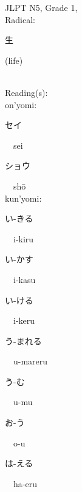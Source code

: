 \begin{multicols}{2}
{JLPT N5, Grade 1, \\Radical:\ \ {\begin{CJK}{UTF8}{min} 生 \end{CJK}} (life) } \\
Reading(s):\ \ \\
{\hspace*{1em}}on'yomi:\ \ \\
{\hspace*{2em}}{\begin{CJK}{UTF8}{min} セイ \end{CJK}}\ \ sei\ \ \\
{\hspace*{2em}}{\begin{CJK}{UTF8}{min} ショウ \end{CJK}}\ \ sh\=o\ \ \\
{\hspace*{1em}}kun'yomi:\ \ \\
{\hspace*{2em}}{\begin{CJK}{UTF8}{min} い-きる \end{CJK}}\ \ i-kiru\ \ \\
{\hspace*{2em}}{\begin{CJK}{UTF8}{min} い-かす \end{CJK}}\ \ i-kasu\ \ \\
{\hspace*{2em}}{\begin{CJK}{UTF8}{min} い-ける \end{CJK}}\ \ i-keru\ \ \\
{\hspace*{2em}}{\begin{CJK}{UTF8}{min} う-まれる \end{CJK}}\ \ u-mareru\ \ \\
{\hspace*{2em}}{\begin{CJK}{UTF8}{min} う-む \end{CJK}}\ \ u-mu\ \ \\
{\hspace*{2em}}{\begin{CJK}{UTF8}{min} お-う \end{CJK}}\ \ o-u\ \ \\
{\hspace*{2em}}{\begin{CJK}{UTF8}{min} は-える \end{CJK}}\ \ ha-eru\ \ \\

\end{multicols}
